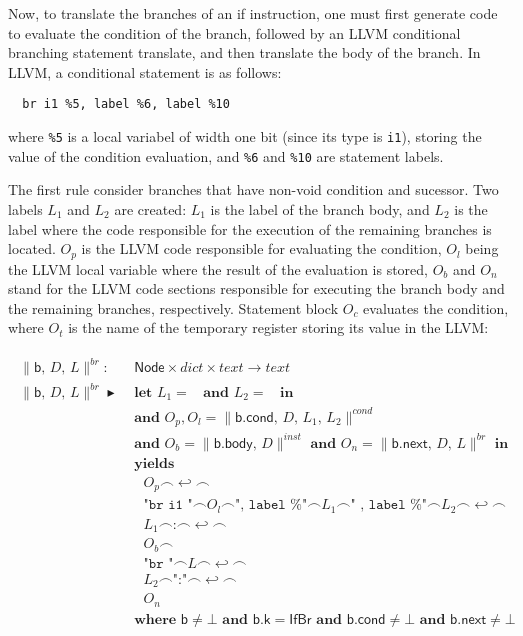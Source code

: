 \documentclass{article}
\newcommand{\trad}[2]{\ensuremath{\lVert \textsf{#1} \rVert^{\textit{#2}}}}
\newcommand{\nl}[0]{\ensuremath{\hookleftarrow}}
\DeclareMathOperator{\conc}{\smallfrown}
\DeclareMathOperator{\isdef}{\blacktriangleright}
\DeclareMathOperator{\name}{\mathcal{L}()}
\begin{document}
Now, to translate the branches of an if instruction, one must first
generate code to evaluate the condition of the branch, followed by an
LLVM conditional branching statement translate, and then translate the
body of the branch. In LLVM, a conditional statement is as follows:
\begin{verbatim}
  br i1 %5, label %6, label %10
\end{verbatim}
where \texttt{\%5} is a local variabel of width one bit (since its
type is \texttt{i1}), storing the value of the condition evaluation,
and \texttt{\%6} and \texttt{\%10} are statement labels.

The first rule consider branches that have non-void condition and
sucessor.  Two labels $L_1$ and $L_2$ are created: $L_1$ is the label
of the branch body, and $L_2$ is the label where the code responsible
for the execution of the remaining branches is located. $O_p$ is the
LLVM code responsible for evaluating the condition, $O_l$ being the
LLVM local variable where the result of the evaluation is stored,
$O_b$ and $O_n$ stand for the LLVM code sections responsible for
executing the branch body and the remaining branches, respectively.
Statement block $O_c$ evaluates the condition, where $O_t$ is the name
of the temporary register storing its value in the LLVM:

\begin{framed}
\begin{align}
\begin{split}
  \trad{b, $D$, $L$}{br} : & \textsf{ Node} \times dict \times text \rightarrow text \\
  \trad{b, $D$, $L$}{br} \isdef 
  & \textbf{ let } L_1 = \name \textbf{ and } L_2 = \name \textbf{ in}  \\
  & \textbf{ and } O_p, O_l = \trad{b.cond, $D$, $L_1$, $L_2$}{cond}  \\
  & \textbf{ and } O_b = \trad{b.body, $D$}{inst} \textbf{ and }
  O_n = \trad{b.next, $D$, $L$}{br} \textbf{ in}  \\
  & \textbf{ yields }  \\
  & \quad O_p \conc \nl \conc  \\
  & \quad \texttt{"br i1 "} \conc O_l \conc \texttt{", label \%"} \conc L_1 \conc \texttt{" , label \%"} \conc L_2 \conc \nl \conc  \\
  & \quad L_1 \conc \texttt{:} \conc \nl \conc  \\
  & \quad O_b \conc  \\
  & \quad \texttt{"br "} \conc L \conc \nl \conc  \\
  & \quad L_2 \conc \texttt{":"} \conc \nl \conc  \\
  & \quad O_n  \\
  & \textbf{ where } \textsf{b} \ne \bot \textbf{ and } \textsf{b.k} = \textsf{IfBr} \textbf{ and } \textsf{b.cond} \ne \bot \textbf{ and } \textsf{b.next} \ne \bot 
\end{split}
\end{align}
\end{framed}
\end{document}
